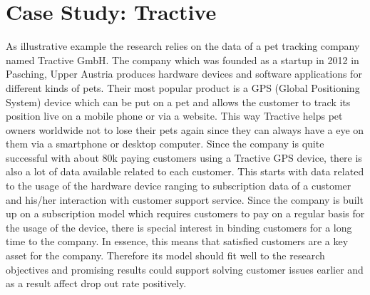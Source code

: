 \section{Case Study: Tractive}
\label{sec:illustrationExample}
As illustrative example the research relies on the data of a pet tracking company named Tractive GmbH. The company which was founded as a startup in 2012 in Pasching, Upper Austria produces hardware devices and software applications for different kinds of pets. Their most popular product is a GPS (Global Positioning System) device which can be put on a pet and allows the customer to track its position live on a mobile phone or via a website. This way Tractive helps pet owners worldwide not to lose their pets again since they can always have a eye on them via a smartphone or desktop computer. Since the company is quite successful with about 80k paying customers using a Tractive GPS device, there is also a lot of data available related to each customer. This starts with data related to the usage of the hardware device ranging to subscription data of a customer and his/her interaction with customer support service. Since the company is built up on a subscription model which requires customers to pay on a regular basis for the usage of the device, there is special interest in binding customers for a long time to the company. In essence, this means that satisfied customers are a key asset for the company. Therefore its model should fit well to the research objectives and promising results could support solving customer issues earlier and as a result affect drop out rate positively. 

